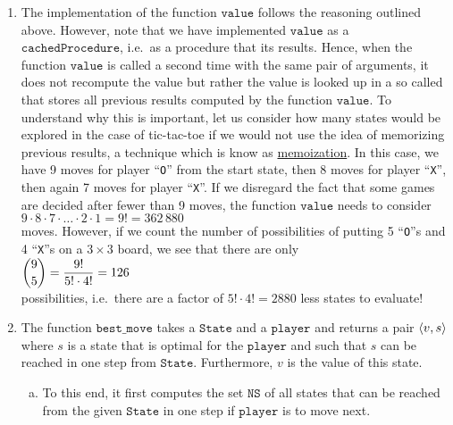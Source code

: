 \begin{enumerate}
\item The implementation of the function $\texttt{value}$ follows the reasoning outlined above.
      However, note that we have implemented $\texttt{value}$ as a $\texttt{cachedProcedure}$, i.e.~as a
      procedure that  its results.  Hence, when the function $\texttt{value}$ is called a
      second time with the same pair of arguments, it does not recompute the value but rather the value is
      looked up in a so called  that stores all previous results computed by the function $\texttt{value}$.  To
      understand why this is important, 
      let us consider how many states would be explored in the case of tic-tac-toe if we would not use the idea
      of memorizing previous results, a technique which is know as 
      \href{https://en.wikipedia.org/wiki/Memoization}{memoization}.  In this case, we have 9 moves for player
      ``\texttt{O}'' from the start state, then 8 moves for player ``\texttt{X}'', then again 7 moves for
      player ``\texttt{X}''.  If we disregard the fact that some games are decided after fewer than 9 moves,
      the function $\texttt{value}$ needs to consider 
      \\[0.2cm]
      \hspace*{1.3cm}
      $9 \cdot 8 \cdot 7 \cdot {\dots} \cdot 2 \cdot 1 = 9! = 362\,880$
      \\[0.2cm]
      moves.  However, if we count the number of possibilities of putting 5 ``\texttt{O}''s and 4
      ``\texttt{X}''s on a $3 \times 3$ board, we see that there are only
      \\[0.2cm]
      \hspace*{1.3cm}
      $\displaystyle {9 \choose 5} = \frac{9!}{5! \cdot 4!} = 126$
      \\[0.2cm]
      possibilities, i.e.~there are a factor of $5! \cdot 4! = 2880$ less states to evaluate!
\item The function $\texttt{best\_move}$ takes a $\texttt{State}$ and a $\texttt{player}$ and returns a pair $\pair(v,s)$
      where $s$ is a state that is optimal for the $\texttt{player}$ and such that $s$ can be reached in one step from
      $\texttt{State}$.  Furthermore, $v$ is the value of this state.
      \begin{enumerate}[(a)]
      \item To this end, it first computes the set $\texttt{NS}$ of all states that can be reached 
            from the given $\texttt{State}$ in one step if $\texttt{player}$ is to move next.

\end{enumerate}
\end{enumerate}
